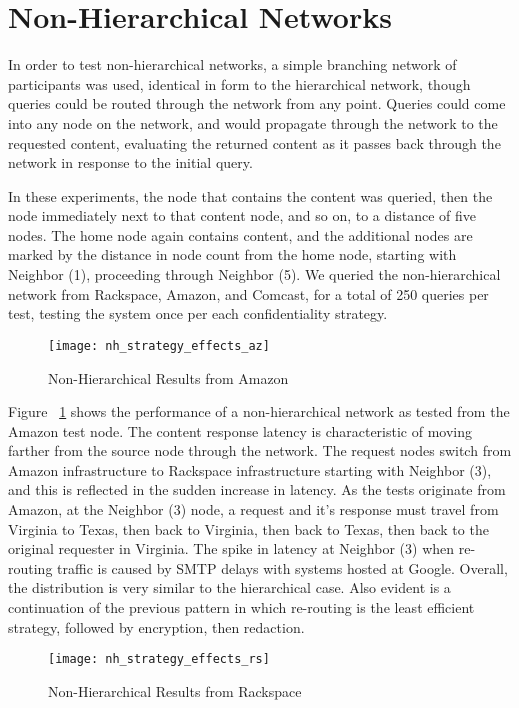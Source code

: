 \section{Non-Hierarchical Networks}
In order to test non-hierarchical networks, a simple branching network of participants was used, identical in form to the hierarchical network, though queries could be routed through the network from any point.  Queries could come into any node on the network, and would propagate through the network to the requested content, evaluating the returned content as it passes back through the network in response to the initial query.

In these experiments, the node that contains the content was queried, then the node immediately next to that content node, and so on, to a distance of five nodes.  The home node again contains content, and the additional nodes are marked by the distance in node count from the home node, starting with Neighbor (1), proceeding through Neighbor (5).  We queried the non-hierarchical network from Rackspace, Amazon, and Comcast, for a total of 250 queries per test, testing the system once per each confidentiality strategy.

\begin{figure}[!t]
\centering
\texttt{[image: nh\_strategy\_effects\_az]}
\caption{Non-Hierarchical Results from Amazon}
\label{fig:model:nh-amazon-results}
\end{figure}

Figure ~\ref{fig:model:nh-amazon-results} shows the performance of a non-hierarchical network as tested from the Amazon test node.  The content response latency is characteristic of moving farther from the source node through the network.  The request nodes switch from Amazon infrastructure to Rackspace infrastructure starting with Neighbor (3), and this is reflected in the sudden increase in latency.  As the tests originate from Amazon, at the Neighbor (3) node, a request and it's response must travel from Virginia to Texas, then back to Virginia, then back to Texas, then back to the original requester in Virginia.  The spike in latency at Neighbor (3) when re-routing traffic is caused by SMTP delays with systems hosted at Google.  Overall, the distribution is very similar to the hierarchical case.  Also evident is a continuation of the previous pattern in which re-routing is the least efficient strategy, followed by encryption, then redaction.

\begin{figure}[!t]
\centering
\texttt{[image: nh\_strategy\_effects\_rs]}
\caption{Non-Hierarchical  Results from Rackspace}
\label{fig:model:nh-rackspace-results}
\end{figure}

